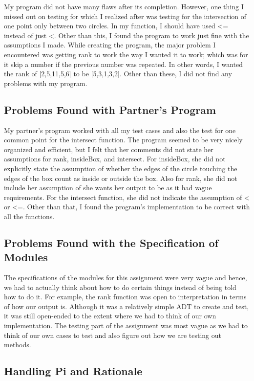 \documentclass[12pt]{article}
\begin{document}
My program did not have many flaws after its completion. However, one thing I missed out on testing for which I realized after was testing for the intersection of one point only between two circles. In my function, I should have used \textless= instead of just \textless. Other than this, I found the program to work just fine with the assumptions I made. While creating the program, the major problem I encountered was getting rank to work the way I wanted it to work; which was for it skip a number if the previous number was repeated. In other words, I wanted the rank of [2,5,11,5,6] to be [5,3,1,3,2]. Other than these, I did not find any problems with my program.

\subsection{Problems Found with Partner's Program}

My partner's program worked with all my test cases and also the test for one common point for the intersect function. The program seemed to be very nicely organized and efficient, but I felt that her comments did not state her assumptions for rank, insideBox, and intersect. For insideBox, she did not explicitly state the assumption of whether the edges of the circle touching the edges of the box count as inside or outside the box. Also for rank, she did not include her assumption of she wants her output to be as it had vague requirements. For the intersect function, she did not indicate the assumption of < or <=. Other than that, I found the program's implementation to be correct with all the functions.

\subsection{Problems Found with the Specification of Modules}

The specifications of the modules for this assignment were very vague and hence, we had to actually think about how to do certain things instead of being told how to do it. For example, the rank function was open to interpretation in terms of how our output is. Although it was a relatively simple ADT to create and test, it was still open-ended to the extent where we had to think of our own implementation. The testing part of the assignment was most vague as we had to think of our own cases to test and also figure out how we are testing out methods.  

\subsection{Handling Pi and Rationale}
\end{document}
